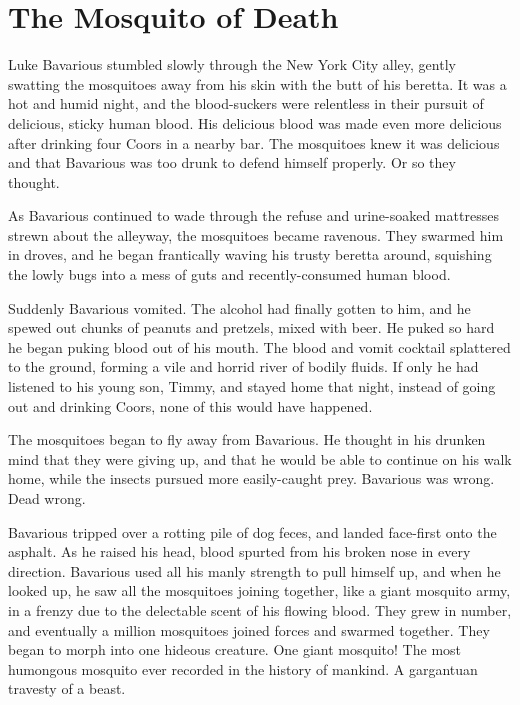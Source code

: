 \chapter{The Mosquito of Death}



Luke Bavarious stumbled slowly through the New York City alley,
gently swatting the mosquitoes away from his skin with the butt of
his beretta. It was a hot and humid night, and the blood-suckers
were relentless in their pursuit of delicious, sticky human blood.
His delicious blood was made even more delicious after drinking
four Coors in a nearby bar. The mosquitoes knew it was delicious
and that Bavarious was too drunk to defend himself properly. Or so
they thought.



As Bavarious continued to wade through the refuse and urine-soaked
mattresses strewn about the alleyway, the mosquitoes became
ravenous. They swarmed him in droves, and he began frantically
waving his trusty beretta around, squishing the lowly bugs into a
mess of guts and recently-consumed human blood.



Suddenly Bavarious vomited. The alcohol had finally gotten to him,
and he spewed out chunks of peanuts and pretzels, mixed with beer.
He puked so hard he began puking blood out of his mouth. The blood
and vomit cocktail splattered to the ground, forming a vile and
horrid river of bodily fluids. If only he had listened to his young
son, Timmy, and stayed home that night, instead of going out and
drinking Coors, none of this would have happened.



The mosquitoes began to fly away from Bavarious. He thought in his
drunken mind that they were giving up, and that he would be able to
continue on his walk home, while the insects pursued more
easily-caught prey. Bavarious was wrong. Dead wrong.



Bavarious tripped over a rotting pile of dog feces, and landed
face-first onto the asphalt. As he raised his head, blood spurted
from his broken nose in every direction. Bavarious used all his
manly strength to pull himself up, and when he looked up, he saw
all the mosquitoes joining together, like a giant mosquito army, in
a frenzy due to the delectable scent of his flowing blood. They
grew in number, and eventually a million mosquitoes joined forces
and swarmed together. They began to morph into one hideous
creature. One giant mosquito! The most humongous mosquito ever
recorded in the history of mankind. A gargantuan travesty of a
beast.



